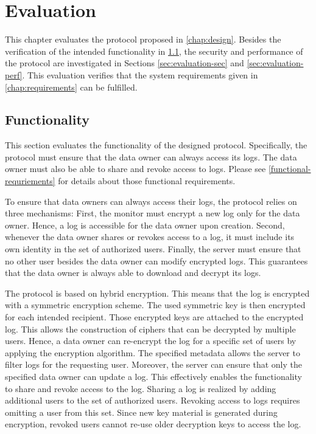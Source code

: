 \documentclass[../main.tex]{subfiles}
\begin{document}
\chapter{Evaluation}
\label{chap:evaluation}

This chapter evaluates the protocol proposed in \cref{chap:design}.
Besides the verification of the intended functionality in \cref{sec:evaluation-func}, the security and performance of the protocol are investigated in Sections \ref{sec:evaluation-sec} and \ref{sec:evaluation-perf}.
This evaluation verifies that the system requirements given in \cref{chap:requirements} can be fulfilled.

\section{Functionality}
\label{sec:evaluation-func}

This section evaluates the functionality of the designed protocol.
Specifically, the protocol must ensure that the data owner can always access its logs.
The data owner must also be able to share and revoke access to logs.
Please see \cref{functional-requriements} for details about those functional requirements.

To ensure that data owners can always access their logs, the protocol relies on three mechanisms:
First, the monitor must encrypt a new log only for the data owner.
Hence, a log is accessible for the data owner upon creation.
Second, whenever the data owner shares or revokes access to a log, it must include its own identity in the set of authorized users.
Finally, the server must ensure that no other user besides the data owner can modify encrypted logs.
This guarantees that the data owner is always able to download and decrypt its logs.

The protocol is based on hybrid encryption.
This means that the log is encrypted with a symmetric encryption scheme.
The used symmetric key is then encrypted for each intended recipient.
Those encrypted keys are attached to the encrypted log.
This allows the construction of ciphers that can be decrypted by multiple users.
Hence, a data owner can re-encrypt the log for a specific set of users by applying the encryption algorithm.
The specified metadata allows the server to filter logs for the requesting user.
Moreover, the server can ensure that only the specified data owner can update a log.
This effectively enables the functionality to share and revoke access to the log.
Sharing a log is realized by adding additional users to the set of authorized users.
Revoking access to logs requires omitting a user from this set.
Since new key material is generated during encryption, revoked users cannot re-use older decryption keys to access the log.
\end{document}
